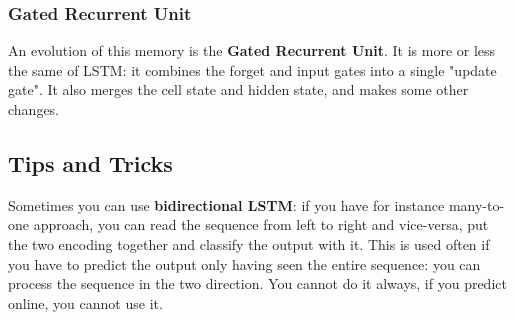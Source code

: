 

\subsubsection{Gated Recurrent Unit}
An evolution of this memory is the \textbf{Gated Recurrent Unit}. It is more or less the same of LSTM: it combines the forget and input gates into a single "update gate". It also merges the cell state and hidden state, and makes some other changes.



\subsection{Tips and Tricks}
Sometimes you can use \textbf{bidirectional LSTM}: if you have for instance many-to-one approach, you can read the sequence from left to right and vice-versa, put the two encoding together and classify the output with it. This is used often if you have to predict the output only having seen the entire sequence: you can process the sequence in the two direction. You cannot do it always, if you predict online, you cannot use it. \\

